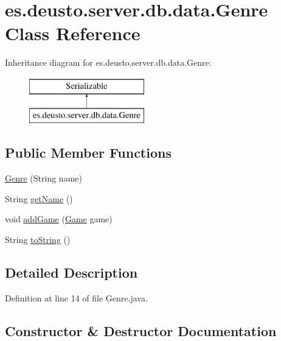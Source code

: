 \hypertarget{classes_1_1deusto_1_1server_1_1db_1_1data_1_1_genre}{}\section{es.\+deusto.\+server.\+db.\+data.\+Genre Class Reference}
\label{classes_1_1deusto_1_1server_1_1db_1_1data_1_1_genre}
Inheritance diagram for es.\+deusto.\+server.\+db.\+data.\+Genre\+:\begin{figure}[H]
\begin{center}
\leavevmode
\includegraphics[height=2.000000cm]{classes_1_1deusto_1_1server_1_1db_1_1data_1_1_genre}
\end{center}
\end{figure}
\subsection*{Public Member Functions}
\begin{DoxyCompactItemize}
\item 
\hyperlink{classes_1_1deusto_1_1server_1_1db_1_1data_1_1_genre_a1fa29d6819400738c473a923bf03cbff}{Genre} (String name)
\item 
String \hyperlink{classes_1_1deusto_1_1server_1_1db_1_1data_1_1_genre_a9a68a612e2209b224801f1f7e0e9dcc9}{get\+Name} ()
\item 
void \hyperlink{classes_1_1deusto_1_1server_1_1db_1_1data_1_1_genre_a268b33c42da6c59b6688db28822e2369}{add\+Game} (\hyperlink{classes_1_1deusto_1_1server_1_1db_1_1data_1_1_game}{Game} game)
\item 
String \hyperlink{classes_1_1deusto_1_1server_1_1db_1_1data_1_1_genre_aeff531adb16e15f04a2f1a11b2b44af4}{to\+String} ()
\end{DoxyCompactItemize}


\subsection{Detailed Description}


Definition at line 14 of file Genre.\+java.



\subsection{Constructor \& Destructor Documentation}
\mbox{\label{classes_1_1deusto_1_1server_1_1db_1_1data_1_1_genre_a1fa29d6819400738c473a923bf03cbff}} 
